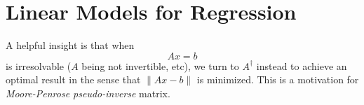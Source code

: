 \chapter{Linear Models for Regression}

A helpful insight is that when
\begin{equation*}
  Ax=b
\end{equation*}
is irresolvable ($A$ being not invertible, etc), we turn to $A^{\dag}$ instead to achieve an optimal result in the sense that $\|Ax-b\|$ is minimized. This is a motivation for \textit{Moore-Penrose pseudo-inverse} matrix.
